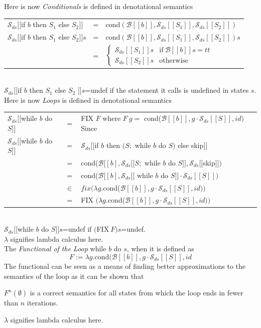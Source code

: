 \documentclass[11pt,a4paper]{article}
\begin{document}
Here is now \textit{Conditionals} is defined in denotational semantics\\
\begin{tabular}{lcl}
$\mathcal{S}_{ds}[[$if $b$ then $S_1$ else $S_2]]$&=&cond$(\mathcal{B}[[b]],\mathcal{S}_{ds}[[S_1]],\mathcal{S}_{ds}[[S_2]])$\\
$\mathcal{S}_{ds}[[$if $b$ then $S_1$ else $S_2]]s$&=&cond$(\mathcal{B}[[b]],\mathcal{S}_{ds}[[S_1]],\mathcal{S}_{ds}[[S_2]])s$\\
&=&$\begin{cases}\mathcal{S}_{ds}[[S_1]]s&\mathrm{if\ }\mathcal{B}[[b]]s=tt\\\mathcal{S}_{ds}[[S_2]]s&\mathrm{otherwise}\end{cases}$
\end{tabular}\\
\nb $\mathcal{S}_{ds}[[$if $b$ then $S_1$ else $S_2$ $]]s$=undef if the statement it calls is undefined in states $s$.\\

Here is now \textit{Loops} is defined in denotational semantics\\
\begin{tabular}{lcl}
$\mathcal{S}_{ds}[[$while $b$ do $S]]$&=&FIX $F$ where $F\ g=$ cond($\mathcal{B}[[b]],g\cdot\mathcal{S}_{ds}[[S]],id)$
Since\\
$\mathcal{S}_{ds}[[$while $b$ do $S]]$&=&$\mathcal{S}_{ds}[[$if $b$ then $(S;$ while $b$ do $S)$ else skip$]]$\\
&=&cond($\mathcal{B}[[b],\mathcal{S}_{ds}[[S;$ while $b$ do $S]],\mathcal{S}_{ds}[[$skip$]])$\\
&=&cond($\mathcal{B}[[b],\mathcal{S}_{ds}[[$ while $b$ do $S]]\cdot\mathcal{S}_{ds}[[S]])$\\
&$\in$&$fix(\lambda g$.cond($\mathcal{B}[[b]],g\cdot\mathcal{S}_{ds}[[S]],id))$\\
&=&FIX $(\lambda g$.cond($\mathcal{B}[[b]],g\cdot\mathcal{S}_{ds}[[S]],id))$\\
\end{tabular}\\
\nb $\mathcal{S}_{ds}[[$while $b$ do $S]]s$=undef if $($FIX$\ F)s$=undef.\\
\nb $\lambda$ signifies lambda calculus here.\\

The \textit{Functional of the Loop} while $b$ do $s$, when it is defined as
$$F:=\lambda g.\mathrm{cond}(\mathcal{B}[[b]],g\cdot\mathcal{S}_{ds}[[S]],id$$
The functional can be seen as a means of finding better approximations to the semantics of the loop as it can be shown that \begin{center}
$F^n(\emptyset)$ is a correct semantics for all states from which the loop ends in fewer than $n$ iterations.
\end{center}
\nb $\lambda$ signifies lambda calculus here.\\
\end{document}
